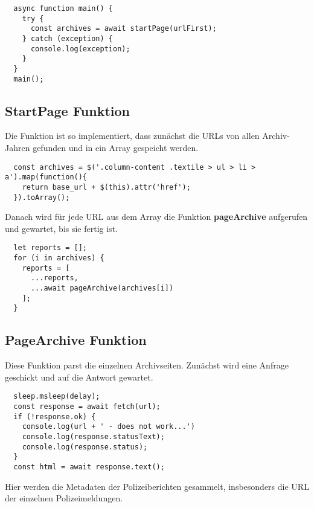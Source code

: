\begin{verbatim}
  async function main() {
    try {
      const archives = await startPage(urlFirst);
    } catch (exception) {
      console.log(exception);
    }
  }
  main();
  \end{verbatim}

\subsection{StartPage Funktion}

Die Funktion ist so implementiert, dass zunächst die URLs von allen Archiv-Jahren
gefunden und in ein Array gespeicht werden.

\begin{verbatim}
  const archives = $('.column-content .textile > ul > li > a').map(function(){
    return base_url + $(this).attr('href');
  }).toArray();
  \end{verbatim}

Danach wird für jede URL aus dem Array die Funktion 
\textbf{pageArchive} aufgerufen und gewartet, bis sie fertig ist.

\begin{verbatim}
  let reports = [];
  for (i in archives) {
    reports = [
      ...reports,
      ...await pageArchive(archives[i])
    ];
  }
  \end{verbatim}

\subsection{PageArchive Funktion}

Diese Funktion parst die einzelnen Archivseiten.
Zunächst wird eine Anfrage geschickt und auf die Antwort gewartet.

\begin{verbatim}
  sleep.msleep(delay);
  const response = await fetch(url);
  if (!response.ok) {
    console.log(url + ' - does not work...')
    console.log(response.statusText);
    console.log(response.status);
  }
  const html = await response.text();
  \end{verbatim}

Hier werden die Metadaten der Polizeiberichten gesammelt, insbesonders die URL der einzelnen Polizeimeldungen.

